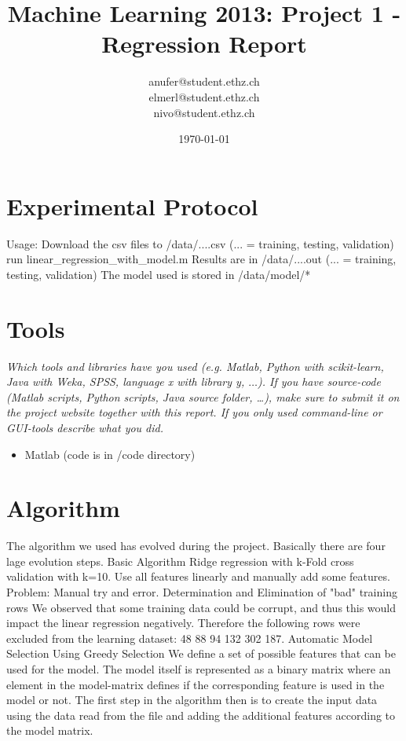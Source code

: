 \documentclass[a4paper, 11pt]{article}
\title{Machine Learning 2013: Project 1 - Regression Report}
\author{anufer@student.ethz.ch\\ elmerl@student.ethz.ch\\ nivo@student.ethz.ch\\}
\date{\today}
\begin{document}
\maketitle

\section*{Experimental Protocol}
Usage:\linebreak
Download the csv files to /data/....csv (... = training, testing, validation)\linebreak
run linear\_regression\_with\_model.m \linebreak
Results are in /data/....out (... = training, testing, validation)
The model used is stored in /data/model/*

\section{Tools}
\textit{Which tools and libraries have you used (e.g. Matlab, Python with scikit-learn, Java with Weka,
SPSS, language x with library y, $\ldots$). If you have source-code (Matlab scripts, Python scripts, Java source folder, \dots),
make sure to submit it on the project website together with this report. If you only used
command-line or GUI-tools describe what you did.}
\begin{itemize}
\item Matlab (code is in /code directory)
\end{itemize}

\section{Algorithm}
The algorithm we used has evolved during the project. Basically there are four lage evolution steps.
Basic Algorithm
Ridge regression with k-Fold cross validation with k=10. Use all features linearly and manually add some features. Problem: Manual try and error.
Determination and Elimination of "bad" training rows
We observed that some training data could be corrupt, and thus this would impact the linear regression negatively. Therefore the following rows were excluded from the learning dataset:
48 88 94 132 302 187.
Automatic Model Selection Using Greedy Selection
We define a set of possible features that can be used for the model. The model itself is represented as a binary matrix where an element in the model-matrix defines if the corresponding feature is used in the model or not.
The first step in the algorithm then is to create the input data using the data read from the file and adding the additional features according to the model matrix.
\end{document}
